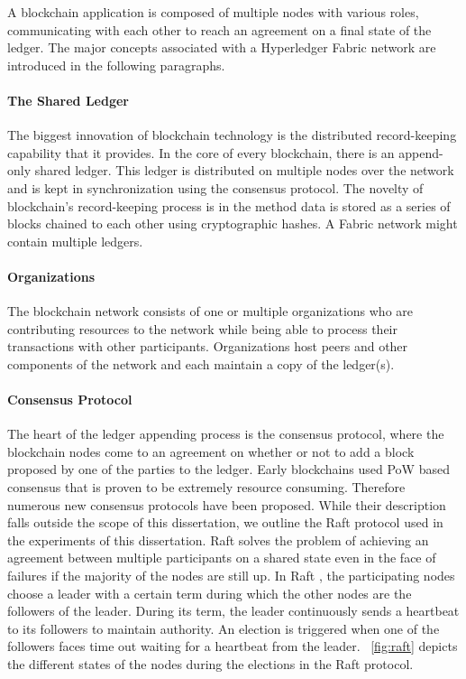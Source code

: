 A blockchain application is composed of multiple nodes with various roles, communicating with each other to reach an agreement on a final state of the ledger. The major concepts associated with a Hyperledger Fabric network are introduced in the following paragraphs.

\paragraph{The Shared Ledger}

The biggest innovation of blockchain technology is the distributed record-keeping capability that it provides. In the core of every blockchain, there is an append-only shared ledger. This ledger is distributed on multiple nodes over the network and is kept in synchronization using the consensus protocol. The novelty of blockchain's record-keeping process is in the method data is stored as a series of blocks chained to each other using cryptographic hashes. A Fabric network might contain multiple ledgers.%

 \paragraph{Organizations}
 
 The blockchain network consists of one or multiple organizations who are contributing resources to the network while being able to process their transactions with other participants. Organizations host peers and other components of the network and each maintain a copy of the ledger(s).

\paragraph{Consensus Protocol}

The heart of the ledger appending process is the consensus protocol, where the blockchain nodes come to an agreement on whether or not to add a block proposed by one of the parties to the ledger. Early blockchains used \ac{PoW} based consensus that is proven to be extremely resource consuming. Therefore numerous new consensus protocols have been proposed. While their description falls outside the scope of this dissertation, we outline the Raft protocol \cite{Ongaro:raft} used in the experiments of this dissertation. Raft solves the problem of achieving an agreement between multiple participants on a shared state even in the face of failures if the majority of the nodes are still up. In Raft \cite{Ongaro:raft}, the participating nodes choose a leader with a certain term during which the other nodes are the followers of the leader. During its term, the leader continuously sends a heartbeat to its followers to maintain authority. An election is triggered when one of the followers faces time out waiting for a heartbeat from the leader. \figureautorefname~\ref{fig:raft} depicts the different states of the nodes during the elections in the Raft protocol. 


